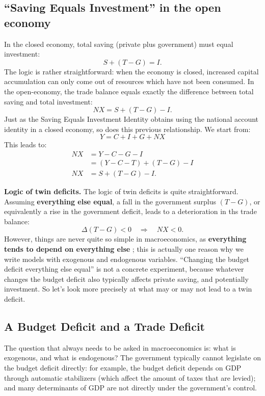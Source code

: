 \documentclass[]{book}
\begin{document}
\subsection{\texorpdfstring{``Saving Equals Investment'' in the open
economy}{Saving Equals Investment in the open economy}}\label{saving-equals-investment-in-the-open-economy}

In the closed economy, total saving (private plus government) must equal
investment: \[S +\left(T-G\right) = I.\] The logic is rather
straightforward: when the economy is closed, increased capital
accumulation can only come out of resources which have not been
consumed. In the open-economy, the trade balance equals exactly the
difference between total saving and total investment:
\[\boxed{NX = S +\left(T-G\right) - I}.\] Just as the Saving Equals
Investment Identity obtains using the national account identity in a
closed economy, so does this previous relationship. We start from:
\[Y = C+I+G+NX\] This leads to: \[
\begin{aligned}
NX &= Y-C-G-I \\
&=\left(Y-C-T\right)+\left(T-G\right)-I\\
NX &= S + \left(T-G\right)-I.
\end{aligned}
\]

\textbf{Logic of twin deficits.} The logic of twin deficits is quite
straightforward. Assuming \textbf{everything else equal}, a fall in the
government surplus \((T-G)\), or equivalently a rise in the government
deficit, leads to a deterioration in ths trade balance:
\[\boxed{\Delta(T-G)<0 \quad \Rightarrow \quad NX<0}.\] However, things
are never quite so simple in macroeconomics, as \textbf{everything tends
to depend on everything else} ; this is actually one reason why we write
models with exogenous and endogenous variables. ``Changing the budget
deficit everything else equal'' is not a concrete experiment, because
whatever changes the budget deficit also typically affects private
saving, and potentially investment. So let's look more precisely at what
may or may not lead to a twin deficit.

\subsection{A Budget Deficit and a Trade
Deficit}\label{a-budget-deficit-and-a-trade-deficit}

The question that always needs to be asked in macroeconomics is: what is
exogenous, and what is endogenous? The government typically cannot
legislate on the budget deficit directly: for example, the budget
deficit depends on GDP through automatic stabilizers (which affect the
amount of taxes that are levied); and many determinants of GDP are not
directly under the government's control.
\end{document}
